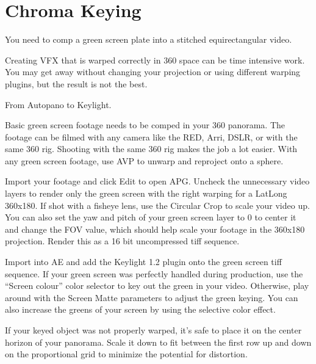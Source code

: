 \chapter{Chroma Keying}
\pagecolor{white}
\label{chap:53}
\begin{fullwidth}

\problem

{\large You need to comp a green screen plate into a stitched equirectangular video. \par}

Creating VFX that is warped correctly in 360 space can be time intensive work. You may get away without changing your projection or using different warping plugins, but the result is not the best. 

\solution

{\large From Autopano to Keylight. \par}

Basic green screen footage needs to be comped in your 360 panorama. The footage can be filmed with any camera like the RED, Arri, DSLR, or with the same 360 rig. Shooting with the same 360 rig makes the job a lot easier. With any green screen footage, use AVP to unwarp and reproject onto a sphere. 


Import your footage and click Edit to open APG. Uncheck the unnecessary video layers to render only the green screen with the right warping for a LatLong 360x180. If shot with a fisheye lens, use the Circular Crop to scale your video up. You can also set the yaw and pitch of your green screen layer to 0 to center it and change the FOV value, which should help scale your footage in the 360x180 projection. Render this as a 16 bit uncompressed tiff sequence.


Import into AE and add the Keylight 1.2 plugin onto the green screen tiff sequence. If your green screen was perfectly handled during production, use the “Screen colour” color selector to key out the green in your video. Otherwise, play around with the Screen Matte parameters to adjust the green keying. You can also increase the greens of your screen by using the selective color effect.

\clearpage
If your keyed object was not properly warped, it's safe to place it on the center horizon of your panorama. Scale it down to fit between the first row up and down on the proportional grid to minimize the potential for distortion.


\end{fullwidth}
